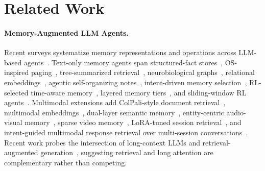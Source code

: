 \documentclass{article}
\begin{document}
\section{Related Work}
\label{sec:related}

\paragraph{Memory-Augmented LLM Agents.}
Recent surveys systematize memory representations and operations across LLM-based agents~\cite{du2025rethinkingmemoryllmbased}. Text-only memory agents span structured-fact stores~\cite{memorybank,scm}, OS-inspired paging~\cite{packer2024memgptllmsoperatingsystems}, tree-summarized retrieval~\cite{raptor}, neurobiological graphs~\cite{gutierrez2025hipporagneurobiologicallyinspiredlongterm}, relational embeddings~\cite{mem0}, agentic self-organizing notes~\cite{amem}, intent-driven memory selection~\cite{du2025memguideintentdrivenmemoryselection}, RL-selected time-aware memory~\cite{du2025memoryt1reinforcementlearningtemporal}, layered memory tiers~\cite{li2025memosoperatingmemoryaugmentedgeneration}, and sliding-window RL agents~\cite{yu2025memagentreshapinglongcontextllm}. Multimodal extensions add ColPali-style document retrieval~\cite{cho2024m3docragmultimodalretrievalneed,faysse2025colpaliefficientdocumentretrieval}, multimodal embeddings~\cite{vlm2vec}, dual-layer semantic memory~\cite{m2a}, entity-centric audio-visual memory~\cite{long2025seeinglisteningrememberingreasoning}, sparse video memory~\cite{song2024moviechat}, LoRA-tuned session retrieval~\cite{jang2025enablingchatbotseyesears}, and intent-guided multimodal response retrieval over multi-session conversations~\cite{Wang_Du_Liang_Bai_Yang_Wang_Wong_Xu_2025}. Recent work probes the intersection of long-context LLMs and retrieval-augmented generation~\cite{jin2024long,jiang2024longrag,asai2023self}, suggesting retrieval and long attention are complementary rather than competing.
\end{document}
